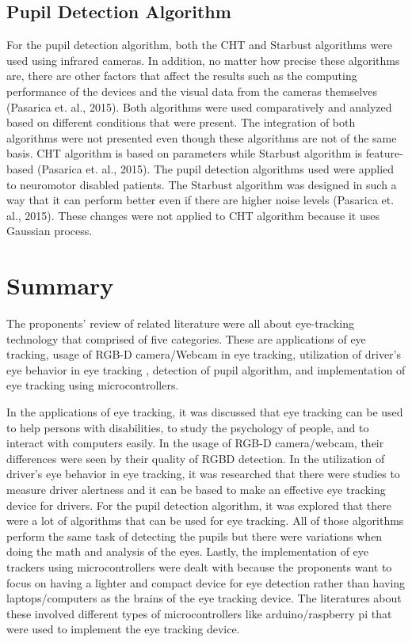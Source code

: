 \subsection{Pupil Detection Algorithm}
For the pupil detection algorithm, both the CHT and Starbust algorithms were used using infrared cameras. In addition, no matter how precise these algorithms are, there are other factors that affect the results such as the computing performance of the devices and the visual data from the cameras themselves (Pasarica et. al., 2015). Both algorithms were used comparatively and analyzed based on different conditions that were present. The integration of both algorithms were not presented even though these algorithms are not of the same basis. CHT algorithm is based on parameters while Starbust algorithm is feature-based (Pasarica et. al., 2015). The pupil detection algorithms used were applied to neuromotor disabled patients. The Starbust algorithm was designed in such a way that it can perform better even if there are higher noise levels (Pasarica et. al., 2015). These changes were not applied to CHT algorithm because it uses Gaussian process. 

\section{Summary}

The proponents’ review of related literature were all about eye-tracking technology that comprised of five categories. These are applications of eye tracking, usage of RGB-D camera/Webcam in eye tracking, utilization of driver’s eye behavior in eye tracking , detection of pupil algorithm, and implementation of eye tracking using microcontrollers. 
\newline

In the applications of eye tracking, it was discussed that eye tracking can be used to help persons with disabilities, to study the psychology of people, and to interact with computers easily. In the usage of RGB-D camera/webcam, their differences were seen by their quality of RGBD detection. In the utilization of driver’s eye behavior in eye tracking, it was researched that there were studies to measure driver alertness and it can be based to make an effective eye tracking device for drivers. For the pupil detection algorithm, it was explored that there were a lot of algorithms that can be used for eye tracking. All of those algorithms perform the same task of detecting the pupils but there were variations when doing the math and analysis of the eyes. Lastly, the implementation of eye trackers using microcontrollers were dealt with because the proponents want to focus on having a lighter and compact device for eye detection rather than having laptops/computers as the brains of the eye tracking device. The literatures about these involved different types of microcontrollers like arduino/raspberry pi that were used to implement the eye tracking device.



